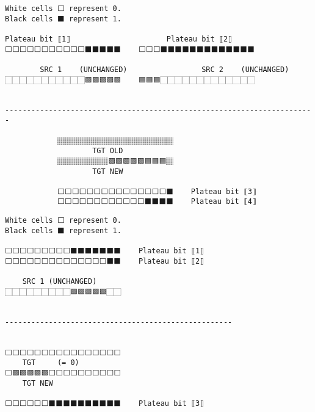 \documentclass[varwidth=\maxdimen,margin=0.5cm,multi={verbatim}]{standalone}
\begin{document}
\begin{verbatim}
White cells ⬜ represent 0.
Black cells ⬛ represent 1.

Plateau bit ⟦1⟧                      Plateau bit ⟦2⟧
⬜⬜⬜⬜⬜⬜⬜⬜⬜⬜⬜⬛⬛⬛⬛⬛    ⬜⬜⬜⬛⬛⬛⬛⬛⬛⬛⬛⬛⬛⬛⬛⬛

        SRC 1    (UNCHANGED)                 SRC 2    (UNCHANGED)
🏻🏻🏻🏻🏻🏻🏻🏻🏻🏻🏻🟩🟩🟩🟩🟩    🟦🟦🟦🏻🏻🏻🏻🏻🏻🏻🏻🏻🏻🏻🏻🏻


-----------------------------------------------------------------------

            🏽🏽🏽🏽🏽🏽🏽🏽🏽🏽🏽🏽🏽🏽🏽🏽
                    TGT OLD
            🏽🏽🏽🏽🏽🏽🏽🟩🟩🟩🟩🟩🟦🟦🟦🏽
                    TGT NEW

            ⬜⬜⬜⬜⬜⬜⬜⬜⬜⬜⬜⬜⬜⬜⬜⬛    Plateau bit ⟦3⟧
            ⬜⬜⬜⬜⬜⬜⬜⬜⬜⬜⬜⬜⬛⬛⬛⬛    Plateau bit ⟦4⟧
\end{verbatim}

\begin{verbatim}
White cells ⬜ represent 0.
Black cells ⬛ represent 1.

⬜⬜⬜⬜⬜⬜⬜⬜⬜⬛⬛⬛⬛⬛⬛⬛    Plateau bit ⟦1⟧
⬜⬜⬜⬜⬜⬜⬜⬜⬜⬜⬜⬜⬜⬜⬛⬛    Plateau bit ⟦2⟧
            
    SRC 1 (UNCHANGED)
🏻🏻🏻🏻🏻🏻🏻🏻🏻🟩🟩🟩🟩🟩🏻🏻


----------------------------------------------------


⬜⬜⬜⬜⬜⬜⬜⬜⬜⬜⬜⬜⬜⬜⬜⬜
    TGT     (= 0)
⬜🟩🟩🟩🟩🟩⬜⬜⬜⬜⬜⬜⬜⬜⬜⬜
    TGT NEW

⬜⬜⬜⬜⬜⬜⬛⬛⬛⬛⬛⬛⬛⬛⬛⬛    Plateau bit ⟦3⟧
\end{verbatim}
\end{document}
